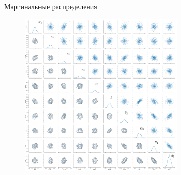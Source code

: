\documentclass[compress]{beamer}
\newcommand\Fontvi{\fontsize{6}{7.2}\selectfont}
\begin{document}
\begin{frame}{Маргинальные распределения}
\begin{figure}[h!!]
\begin{center}
        \includegraphics[width=0.7\textwidth]{../imgs/pairplot.png}
\end{center}
\end{figure}

\end{frame}


\end{document}
